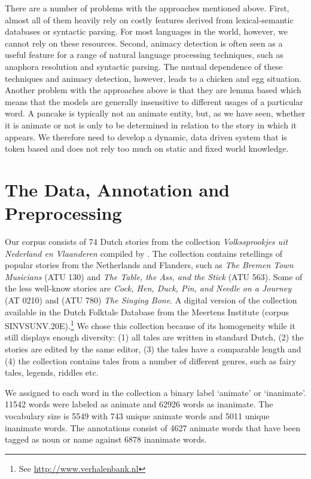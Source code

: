 \documentclass[a4paper,UKenglish]{oasics}
\begin{document}
There are a number of problems with the approaches mentioned
above. First, almost all of them heavily rely on costly features derived from
lexical-semantic databases or syntactic parsing. For most languages in
the world, however, we cannot rely on these resources. Second, animacy
detection is often seen as a useful feature for a range of natural
language processing techniques, such as anaphora resolution and
syntactic parsing. The mutual dependence of these techniques and
animacy detection, however, leads to a chicken and egg
situation. Another problem with the approaches above is that they are
lemma based which means that the models are generally insensitive to
different usages of a particular word. A pancake is typically not an
animate entity, but, as we have seen, whether it is animate or not is
only to be determined in relation to the story in which it appears. We
therefore need to develop a dynamic, data driven system that is token
based and does not rely too much on static and fixed world knowledge.

\section{The Data, Annotation and Preprocessing}\label{sec:data}

Our corpus consists of 74 Dutch stories from the collection
\textit{Volkssprookjes uit Nederland en Vlaanderen} compiled by
\cite{sinninghe:78}. The collection contains retellings of popular
stories from the Netherlands and Flanders, such as \textit{The
  Bremen Town Musicians} (ATU 130) and \textit{The Table, the Ass, and
  the Stick } (ATU 563). Some of the less well-know stories are
\textit{Cock, Hen, Duck, Pin, and Needle on a Journey} (AT 0210) and
(ATU 780) \textit{The Singing Bone}. A digital version of the
collection available in the Dutch Folktale Database from the Meertens
Institute (corpus SINVSUNV.20E).\footnote{See
  \url{http://www.verhalenbank.nl}} We chose this collection because
of its homogeneity while it still displays enough diversity: (1) all
tales are written in standard Dutch, (2) the stories are edited by the
same editor, (3) the tales have a comparable length and (4) the
collection contains tales from a number of different genres, such as
fairy tales, legends, riddles etc.

We assigned to each word in the collection a binary label `animate' or
`inanimate'. 11542 words were labeled as animate and 62926 words as
inanimate. The vocabulary size is 5549 with 743 unique animate words
and 5011 unique inanimate words. The annotations consist of 4627
animate words that have been tagged as noun or name against 6878
inanimate words.
\end{document}

